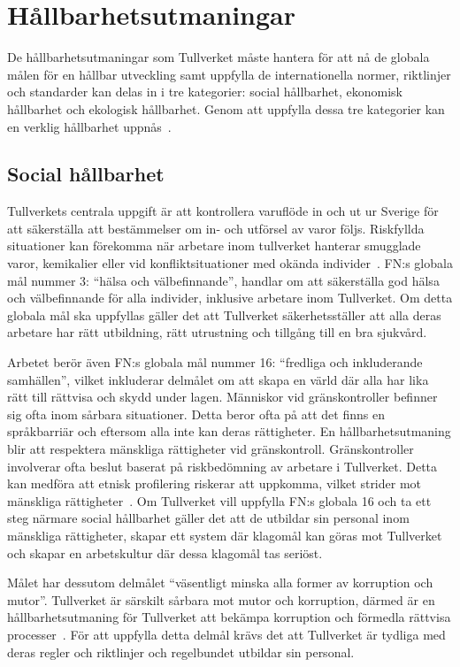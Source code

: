 \section{Hållbarhetsutmaningar}

De hållbarhetsutmaningar som Tullverket måste hantera för att nå de globala
målen för en hållbar utveckling samt uppfylla de internationella normer,
riktlinjer och standarder kan delas in i tre kategorier: social hållbarhet,
ekonomisk hållbarhet och ekologisk hållbarhet. Genom att uppfylla dessa tre
kategorier kan en verklig hållbarhet uppnås~\cite{hallbar}.

\subsection{Social hållbarhet}

Tullverkets centrala uppgift är att kontrollera varuflöde in och ut ur Sverige
för att säkerställa att bestämmelser om in- och utförsel av varor följs.
Riskfyllda situationer kan förekomma när arbetare inom tullverket hanterar
smugglade varor, kemikalier eller vid konfliktsituationer med okända
individer~\cite{vapen}. FN:s globala mål nummer 3: ``hälsa och välbefinnande'',
handlar om att säkerställa god hälsa och välbefinnande för alla individer,
inklusive arbetare inom Tullverket. Om detta globala mål ska uppfyllas gäller
det att Tullverket säkerhetsställer att alla deras arbetare har rätt
utbildning, rätt utrustning och tillgång till en bra sjukvård.

Arbetet berör även FN:s globala mål nummer 16: ``fredliga och inkluderande
samhällen'', vilket inkluderar delmålet om att skapa en värld där alla har lika
rätt till rättvisa och skydd under lagen. Människor vid gränskontroller
befinner sig ofta inom sårbara situationer. Detta beror ofta på att det finns
en språkbarriär och eftersom alla inte kan deras rättigheter. En
hållbarhetsutmaning blir att respektera mänskliga rättigheter vid
gränskontroll. Gränskontroller involverar ofta beslut baserat på riskbedömning
av arbetare i Tullverket. Detta kan medföra att etnisk profilering riskerar att
uppkomma, vilket strider mot mänskliga rättigheter~\cite{etik}. Om Tullverket 
vill uppfylla FN:s globala 16 och ta ett steg närmare social hållbarhet gäller
det att de utbildar sin personal inom mänskliga rättigheter, skapar ett system
där klagomål kan göras mot Tullverket och skapar en arbetskultur där dessa
klagomål tas seriöst.

Målet har dessutom delmålet ``väsentligt minska alla former av korruption och
mutor''. Tullverket är särskilt sårbara mot mutor och korruption, därmed är en
hållbarhetsutmaning för Tullverket att bekämpa korruption och förmedla rättvisa
processer~\cite{granskning2008}. För att uppfylla detta delmål krävs det att
Tullverket är tydliga med deras regler och riktlinjer och regelbundet utbildar
sin personal.

